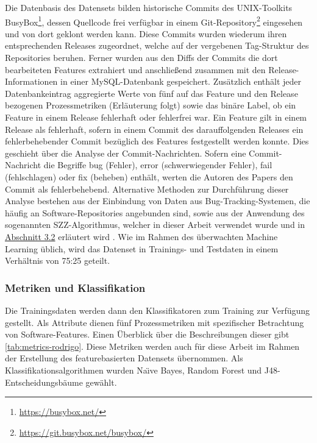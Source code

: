 Die Datenbasis des Datensets bilden historische Commits des UNIX-Toolkits BusyBox\footnote{\url{https://busybox.net/}}, dessen Quellcode frei verfügbar in einem Git-Repository\footnote{\url{https://git.busybox.net/busybox/}} eingesehen und von dort geklont werden kann. Diese Commits wurden wiederum ihren entsprechenden Releases zugeordnet, welche auf der vergebenen Tag-Struktur des Repositories beruhen. Ferner wurden aus den Diffs der Commits die dort bearbeiteten Features extrahiert und anschließend zusammen mit den Release-Informationen in einer MySQL-Datenbank gespeichert. Zusätzlich enthält jeder Datenbankeintrag aggregierte Werte von fünf auf das Feature und den Release bezogenen Prozessmetriken (Erläuterung folgt) sowie das binäre Label, ob ein Feature in einem Release fehlerhaft oder fehlerfrei war. Ein Feature gilt in einem Release als fehlerhaft, sofern in einem Commit des darauffolgenden Releases ein fehlerbehebender Commit bezüglich des Features festgestellt werden konnte. Dies geschieht über die Analyse der Commit-Nachrichten. Sofern eine Commit-Nachricht die Begriffe \glqq bug\grqq{} (Fehler), \glqq error\grqq{} (schwerwiegender Fehler), \glqq fail\grqq{} (fehlschlagen) oder \glqq fix\grqq{} (beheben) enthält, werten die Autoren des Papers den Commit als fehlerbehebend. Alternative Methoden zur Durchführung dieser Analyse bestehen aus der Einbindung von Daten aus Bug-Tracking-Systemen, die häufig an Software-Repositories angebunden sind, sowie aus der Anwendung des sogenannten SZZ-Algorithmus, welcher in dieser Arbeit verwendet wurde und in \hyperref[szz-def]{Abschnitt 3.2} erläutert wird \cite{Sliwerski2005,Zimmermann2007}. Wie im Rahmen des überwachten Machine Learning üblich, wird das Datenset in Trainings- und Testdaten in einem Verhältnis von 75:25 geteilt. 

\subsubsection*{Metriken und Klassifikation}

Die Trainingsdaten werden dann den Klassifikatoren zum Training zur Verfügung gestellt. Als Attribute dienen fünf Prozessmetriken mit spezifischer Betrachtung von Software-Features. Einen Überblick über die Beschreibungen dieser gibt \autoref{tab:metrics-rodrigo}. Diese Metriken werden auch für diese Arbeit im Rahmen der Erstellung des featurebasierten Datensets übernommen. Als Klassifikationsalgorithmen wurden Na\"{\i}ve Bayes, Random Forest und J48-Entscheidungsbäume gewählt.

